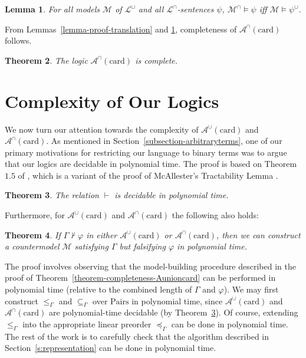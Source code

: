 \documentclass[letterpaper]{article} %
\newtheorem{theorem}{Theorem}[section]
\newtheorem{lemma}[theorem]{Lemma}
\theoremstyle{definition}
\newcommand{\Model}{\mathcal{M}}
\newcommand{\proves}{\vdash}
\newcommand{\lang}{\mathcal{L}}
\newcommand{\Aunion}{\mathscr{A}^{\cup}}
\newcommand{\Ainter}{\mathscr{A}^{\cap}}
\newcommand{\card}{\mathrm{card}}
\newcommand{\Pairs}{\mbox{Pairs}}
\newcommand{\provsub}{\subseteq_{\Gamma}}
\newcommand{\provle}{\le_{\Gamma}}
\newcommand{\provextended}{\preceq_{\Gamma}}
\begin{document}
\begin{lemma}
For all  models $\Model$ of $\lang^\cup$ 
and all $\lang^\cap$-sentences $\psi$, 
$\Model^\cap \models \psi$ iff $\Model \models \psi^\cup$.
\label{proposition-union-inter-conversion}
\end{lemma}

From Lemmas~\ref{lemma-proof-translation} and \ref{proposition-union-inter-conversion}, completeness of $\Ainter(\card)$ follows.

\begin{theorem}
    The logic $\Ainter(\card)$ is complete.
    \label{theorem-completeness-intersection}
\end{theorem}


\section{Complexity of Our Logics}\label{s:complexity}

We now turn our attention towards the complexity of $\Aunion(\card)$ and $\Ainter(\card)$.  As mentioned in Section~\ref{subsection-arbitraryterms}, one of our primary motivations for restricting our language to binary terms was to argue that our logics are decidable in polynomial time.
The proof
is based on Theorem $1.5$ of \cite{exploring_the_landscape}, which is a variant of the proof of McAllester's Tractability Lemma \cite{recognition_of_tractability}.

\begin{theorem}
\label{theorem-ptime}
The relation $\vdash$ is decidable in polynomial time. 
\end{theorem}

Furthermore, for $\Aunion(\card)$ and $\Ainter(\card)$ the following also holds:


\begin{theorem}
If $\Gamma \not \proves \varphi$ in either $\Aunion(\card)$ or $\Ainter(\card)$, then we can construct a countermodel $\Model$ satisfying $\Gamma$ but falsifying $\varphi$ in polynomial time.
\label{theorem-ptime-model-building}
\end{theorem}

The proof involves observing that the model-building procedure described in the proof of Theorem~\ref{theorem-completeness-Aunioncard} can be performed in polynomial time (relative to the combined length of $\Gamma$ and $\varphi$).  We may first construct $\provle$ and $\provsub$ over $\Pairs$ in polynomial time, since $\Aunion(\card)$ and $\Ainter(\card)$ are polynomial-time decidable (by Theorem~\ref{theorem-ptime}).  Of course, extending $\provle$ into the appropriate linear preorder $\provextended$ can be done in polynomial time.  The rest of the work is to carefully check that the algorithm described in Section~\ref{s:representation} can be done in polynomial time.
\end{document}
